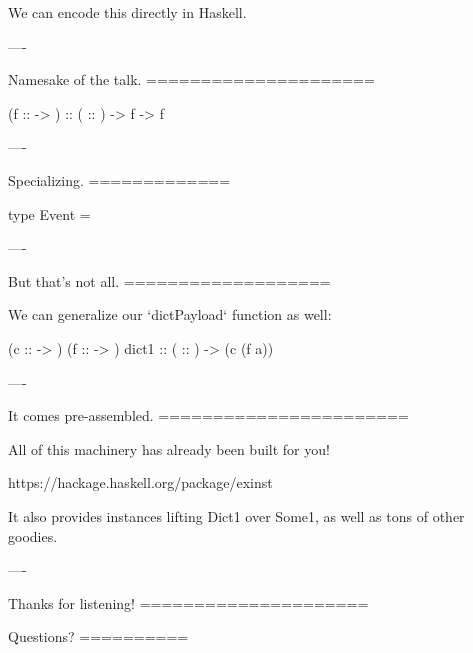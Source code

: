 We can encode this directly in Haskell.

----

Namesake of the talk.
=====================

\begin{custom}
    (f ::  -> ) 
     ::  ( :: ) -> f  ->  f
\end{custom}

----

Specializing.
=============

\begin{raw}
  type Event = 
\end{raw}

----

But that's not all.
===================

We can generalize our `dictPayload` function as well:

\begin{custom}
    (c ::  -> )
              (f ::   -> ) 
    dict1 ::  ( :: ) ->  (c (f a))
\end{custom}

----

It comes pre-assembled.
=======================

All of this machinery has already been built for you!

https://hackage.haskell.org/package/exinst

It also provides instances lifting Dict1 over Some1, as well as tons of other goodies.

----

Thanks for listening!
=====================

Questions?
==========

